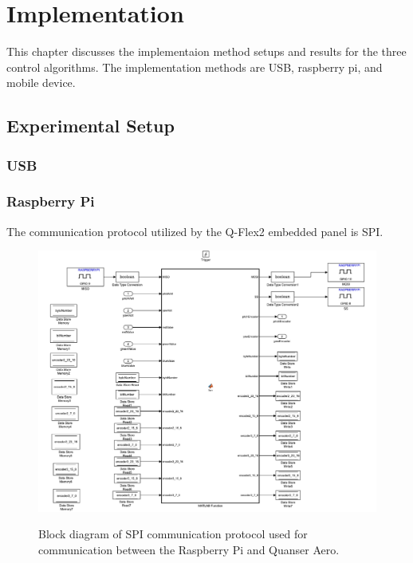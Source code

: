 \chapter{Implementation}
\label{ch: Chapter5}
This chapter discusses the implementaion method setups and results for the three control algorithms.  The implementation methods are USB, raspberry pi, and mobile device.
\section{Experimental Setup}
\subsection{USB}


\subsection{Raspberry Pi}
The communication protocol utilized by the Q-Flex2 embedded panel is SPI.  
\begin{figure}[!htbp]
    \centering
    \includegraphics[width=.46\textwidth,keepaspectratio=true]{figs/img/SPI_COM.pdf}
    \label{fig:SPI_COM}
    \caption{Block diagram of SPI communication protocol used for communication between the Raspberry Pi and Quanser Aero.}
\end{figure}



